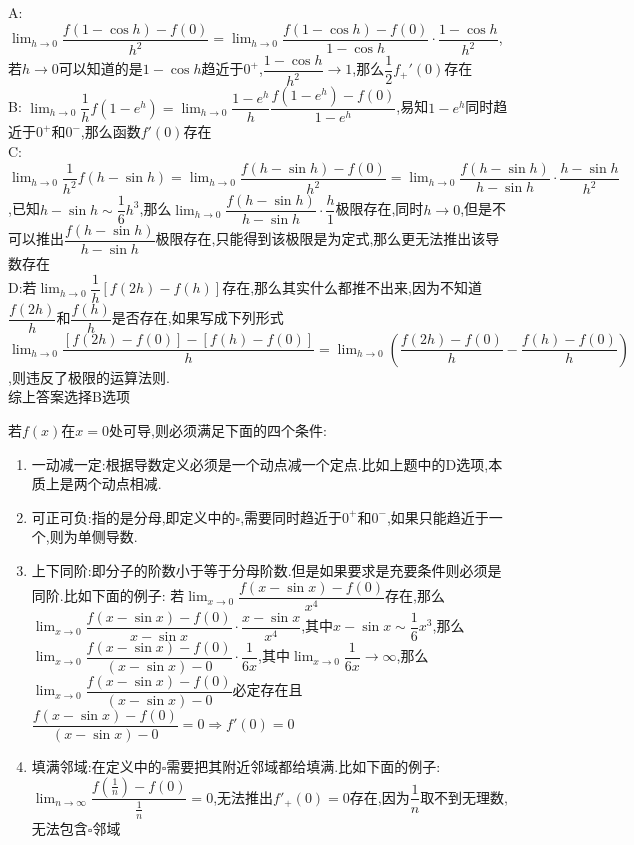\documentclass[8pt a4paper, oneside, UTF8]{ctexbook}  %
\begin{document}
\begin{sloppypar}
\begin{problem}
    \end{problem}
    \begin{solution}
        A: $\lim_{h \to 0}\dfrac{f(1 -\cos h)-f(0)}{h^2}=\lim_{h \to 0}\dfrac{f(1-\cos h)-f(0)}{1-\cos h}\cdot \dfrac{1-\cos h}{h^2}$,若$h \to 0$可以知道的是$1- \cos h$趋近于$0^+$,$\dfrac{1 - \cos h}{h^2} \to 1$,那么$\dfrac{1}{2}f_+'(0)$存在\\
        B: $\lim_{h \to 0}\dfrac{1}{h}f(1-e^h)=\lim_{h \to 0}\dfrac{1-e^h}{h}\dfrac{f(1-e^h)-f(0)}{1-e^h}$,易知$1-e^h$同时趋近于$0^+$和$0^-$,那么函数$f'(0)$存在\\
        C:$\lim_{h \to 0}\dfrac{1}{h^2}f(h- \sin h)=\lim_{h\to 0}\dfrac{f(h-\sin h)-f(0)}{h^2}=\lim_{h \to 0}\dfrac{f(h-\sin h)}{h -\sin h}\cdot \dfrac{h-\sin h}{h^2}$,已知$h -\sin h \sim \dfrac{1}{6}h^3$,那么$\lim_{h \to 0}\dfrac{f(h-\sin h)}{h -\sin h}\cdot \dfrac{h}{1}$极限存在,同时$h \to 0$,但是不可以推出$\dfrac{f(h-\sin h)}{h-\sin h}$极限存在,只能得到该极限是为定式,那么更无法推出该导数存在\\
        D:若$\lim_{h \to 0}\dfrac{1}{h}[f(2h)-f(h)]$存在,那么其实什么都推不出来,因为不知道$\dfrac{f(2h)}{h}$和$\dfrac{f(h)}{h}$是否存在,如果写成下列形式$\lim_{h \to 0}\dfrac{[f(2h)-f(0)]-[f(h)-f(0)]}{h}=\lim_{h \to 0}\left(\dfrac{f(2h)-f(0)}{h}-\dfrac{f(h)-f(0)}{h}\right)$,则违反了极限的运算法则.\\
        综上答案选择B选项
    \end{solution}
    \begin{conclusion}{若$f(x)$在$x=0$处可导,则必须满足下面的四个条件:}{}
        \begin{enumerate}
            \item 一动减一定:根据导数定义必须是一个动点减一个定点.比如上题中的D选项,本质上是两个动点相减.
            \item 可正可负:指的是分母,即定义中的$\square$,需要同时趋近于$0^+$和$0^-$,如果只能趋近于一个,则为单侧导数.
            \item 上下同阶:即分子的阶数小于等于分母阶数.但是如果要求是充要条件则必须是同阶.比如下面的例子:
            若$\lim_{x\to 0}\dfrac{f(x-\sin x)-f(0)}{x^4}$存在,那么$\lim_{x\to 0}\dfrac{f(x-\sin x)-f(0)}{x-\sin x}\cdot \dfrac{x - \sin x}{x^4}$,其中$ x - \sin x \sim \dfrac{1}{6}x^3$,那么$\lim_{x\to 0}\dfrac{f(x-\sin x)-f(0)}{(x-\sin x)-0}\cdot \dfrac{1}{6x}$,其中$\lim_{x\to 0} \dfrac{1}{6x} \to \infty$,那么$\lim_{x\to 0}\dfrac{f(x-\sin x)-f(0)}{(x-\sin x)-0}$必定存在且$\dfrac{f(x-\sin x)-f(0)}{(x-\sin x)-0}=0 \Rightarrow f'(0)=0$
            \item 填满邻域:在定义中的$\square$需要把其附近邻域都给填满.比如下面的例子:$\lim_{n\to \infty}\dfrac{f(\frac{1}{n})-f(0)}{\frac{1}{n}}=0$,无法推出$f'_+(0)=0$存在,因为$\dfrac{1}{n}$取不到无理数,无法包含$\square$邻域

\end{enumerate}
\end{conclusion}
\end{sloppypar}
\end{document}
